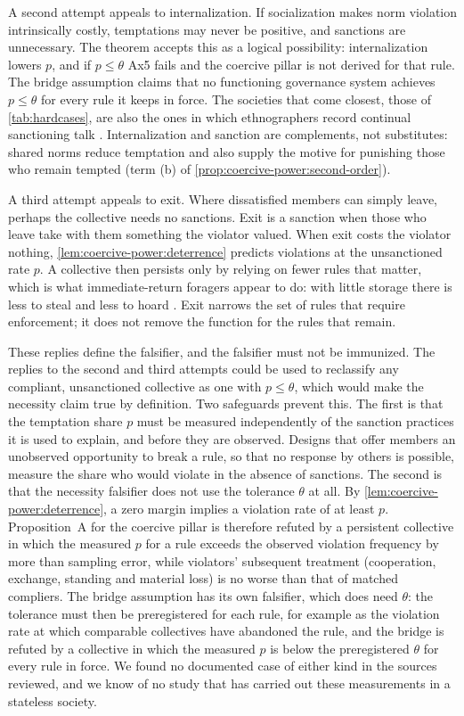 \documentclass[11pt,letterpaper]{article}
\theoremstyle{definition}
\theoremstyle{remark}
\begin{document}
A second attempt appeals to internalization. If socialization makes norm violation intrinsically costly, temptations may never be positive, and sanctions are unnecessary. The theorem accepts this as a logical possibility: internalization lowers $p$, and if $p \le \theta$ Ax5 fails and the coercive pillar is not derived for that rule. The bridge assumption claims that no functioning governance system achieves $p \le \theta$ for every rule it keeps in force. The societies that come closest, those of \cref{tab:hardcases}, are also the ones in which ethnographers record continual sanctioning talk \citep{wiessner2005}. Internalization and sanction are complements, not substitutes: shared norms reduce temptation and also supply the motive for punishing those who remain tempted (term (b) of \cref{prop:coercive-power:second-order}).

A third attempt appeals to exit. Where dissatisfied members can simply leave, perhaps the collective needs no sanctions. Exit is a sanction when those who leave take with them something the violator valued. When exit costs the violator nothing, \cref{lem:coercive-power:deterrence} predicts violations at the unsanctioned rate $p$. A collective then persists only by relying on fewer rules that matter, which is what immediate-return foragers appear to do: with little storage there is less to steal and less to hoard \citep{woodburn1982}. Exit narrows the set of rules that require enforcement; it does not remove the function for the rules that remain.

These replies define the falsifier, and the falsifier must not be immunized. The replies to the second and third attempts could be used to reclassify any compliant, unsanctioned collective as one with $p \le \theta$, which would make the necessity claim true by definition. Two safeguards prevent this. The first is that the temptation share $p$ must be measured independently of the sanction practices it is used to explain, and before they are observed. Designs that offer members an unobserved opportunity to break a rule, so that no response by others is possible, measure the share who would violate in the absence of sanctions. The second is that the necessity falsifier does not use the tolerance $\theta$ at all. By \cref{lem:coercive-power:deterrence}, a zero margin implies a violation rate of at least $p$. Proposition~A for the coercive pillar is therefore refuted by a persistent collective in which the measured $p$ for a rule exceeds the observed violation frequency by more than sampling error, while violators' subsequent treatment (cooperation, exchange, standing and material loss) is no worse than that of matched compliers. The bridge assumption has its own falsifier, which does need $\theta$: the tolerance must then be preregistered for each rule, for example as the violation rate at which comparable collectives have abandoned the rule, and the bridge is refuted by a collective in which the measured $p$ is below the preregistered $\theta$ for every rule in force. We found no documented case of either kind in the sources reviewed, and we know of no study that has carried out these measurements in a stateless society.
\end{document}
